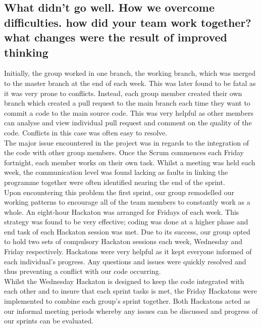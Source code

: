 \documentclass{article}[11pt,Tahoma]
\begin{document}
		\subsection{What didn't go well. How we overcome difficulties. how did your team work together? what changes were the result of improved thinking }	
			Initially, the group worked in one branch, the working branch, which was merged to the master branch at the end of each week. This was later found to be fatal as it was very prone to conflicts.  Instead, each group member created their own branch which created a pull request to the main branch each time they want to commit a code to the main source code. This was very helpful as other members can analyse and view individual pull request and comment on the quality of the code.  Conflicts in this case was often easy to resolve.\\ 
			The major issue encountered in the project was in regards to the integration of the code with other group members. Once the Scrum commences each Friday fortnight, each member works on their own task.  Whilst a meeting was held each week, the communication level was found lacking as faults in linking the programme together were often identified nearing the end of the sprint.\\
			Upon encountering this problem the first sprint, our group remodelled our working patterns to encourage all of the team members to constantly work as a whole.  An eight-hour Hackaton was arranged for Fridays of each week.  This strategy was found to be very effective; coding was done at a higher phase and end task of each Hackaton session was met.  Due to its success, our group opted to hold two sets of compulsory Hackaton sessions each week, Wednesday and Friday respectively.  Hackatons were very helpful as it kept everyone informed of each individual's progress. Any questions and issues were quickly resolved and thus preventing a conflict with our code occurring.\\
			Whilst the Wednesday Hackaton is designed to keep the code integrated with each other and to insure that each sprint tasks is met, the Friday Hackatons were implemented to combine each group's sprint together. Both Hackatons acted as our informal meeting periods whereby any issues can be discussed and progress of our sprints can be evaluated.
\end{document}
